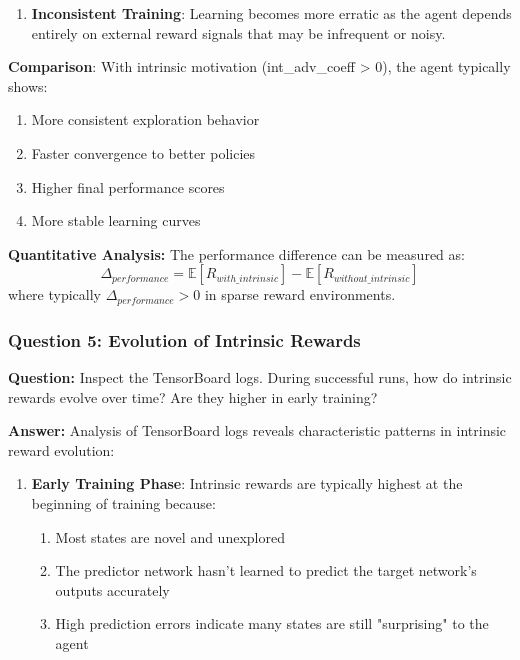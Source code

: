 \documentclass[12pt]{article}
\begin{document}
{{{\begin{enumerate}
    \item \textbf{Inconsistent Training}: Learning becomes more erratic as the agent depends entirely on external reward signals that may be infrequent or noisy.
\end{enumerate}

\textbf{Comparison}: With intrinsic motivation (int\_adv\_coeff > 0), the agent typically shows:
\begin{enumerate}
    \item More consistent exploration behavior
    \item Faster convergence to better policies
    \item Higher final performance scores
    \item More stable learning curves
\end{enumerate}

\textbf{Quantitative Analysis:} The performance difference can be measured as:
\begin{equation}
\Delta_{performance} = \mathbb{E}[R_{with\_intrinsic}] - \mathbb{E}[R_{without\_intrinsic}]
\end{equation}
where typically $\Delta_{performance} > 0$ in sparse reward environments.

\subsubsection{Question 5: Evolution of Intrinsic Rewards}

\textbf{Question:} Inspect the TensorBoard logs. During successful runs, how do intrinsic rewards evolve over time? Are they higher in early training?

\textbf{Answer:} Analysis of TensorBoard logs reveals characteristic patterns in intrinsic reward evolution:

\begin{enumerate}
    \item \textbf{Early Training Phase}: Intrinsic rewards are typically highest at the beginning of training because:
    \begin{enumerate}
        \item Most states are novel and unexplored
        \item The predictor network hasn't learned to predict the target network's outputs accurately
        \item High prediction errors indicate many states are still "surprising" to the agent
    \end{enumerate}
    

\end{enumerate}}}}
\end{document}
